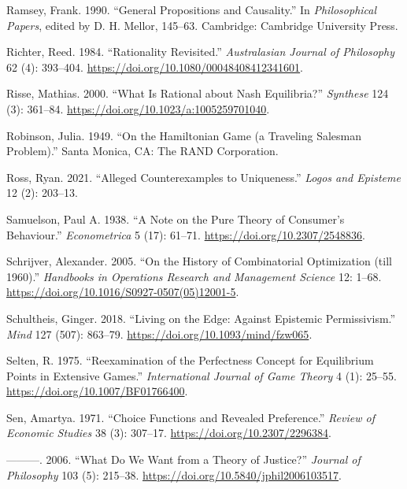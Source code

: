 \documentclass[
  12pt,
  letterpaper,
  DIV=11,
  numbers=noendperiod]{scrreprt}
\newlength{\cslhangindent}
\newenvironment{CSLReferences}[2] %
 {\begin{list}{}{%
  \setlength{\itemindent}{0pt}
  \setlength{\leftmargin}{0pt}
  \setlength{\parsep}{0pt}
  \ifodd #1
   \setlength{\leftmargin}{\cslhangindent}
   \setlength{\itemindent}{-1\cslhangindent}
  \fi
  \setlength{\itemsep}{#2\baselineskip}}}
 {\end{list}}
\begin{document}
\begin{CSLReferences}{1}{0}
Ramsey, Frank. 1990. {``General Propositions and Causality.''} In
\emph{Philosophical Papers}, edited by D. H. Mellor, 145--63. Cambridge:
Cambridge University Press.

Richter, Reed. 1984. {``Rationality Revisited.''} \emph{Australasian
Journal of Philosophy} 62 (4): 393--404.
\url{https://doi.org/10.1080/00048408412341601}.

Risse, Mathias. 2000. {``What Is Rational about Nash Equilibria?''}
\emph{Synthese} 124 (3): 361--84.
\url{https://doi.org/10.1023/a:1005259701040}.

Robinson, Julia. 1949. {``On the Hamiltonian Game (a Traveling Salesman
Problem).''} Santa Monica, CA: The RAND Corporation.

Ross, Ryan. 2021. {``Alleged Counterexamples to Uniqueness.''}
\emph{Logos and Episteme} 12 (2): 203--13.

Samuelson, Paul A. 1938. {``A Note on the Pure Theory of Consumer's
Behaviour.''} \emph{Econometrica} 5 (17): 61--71.
\url{https://doi.org/10.2307/2548836}.

Schrijver, Alexander. 2005. {``On the History of Combinatorial
Optimization (till 1960).''} \emph{Handbooks in Operations Research and
Management Science} 12: 1--68.
\url{https://doi.org/10.1016/S0927-0507(05)12001-5}.

Schultheis, Ginger. 2018. {``Living on the Edge: Against Epistemic
Permissivism.''} \emph{Mind} 127 (507): 863--79.
\url{https://doi.org/10.1093/mind/fzw065}.

Selten, R. 1975. {``Reexamination of the Perfectness Concept for
Equilibrium Points in Extensive Games.''} \emph{International Journal of
Game Theory} 4 (1): 25--55. \url{https://doi.org/10.1007/BF01766400}.

Sen, Amartya. 1971. {``Choice Functions and Revealed Preference.''}
\emph{Review of Economic Studies} 38 (3): 307--17.
\url{https://doi.org/10.2307/2296384}.

---------. 2006. {``What Do We Want from a Theory of Justice?''}
\emph{Journal of Philosophy} 103 (5): 215--38.
\url{https://doi.org/10.5840/jphil2006103517}.


\end{CSLReferences}
\end{document}
